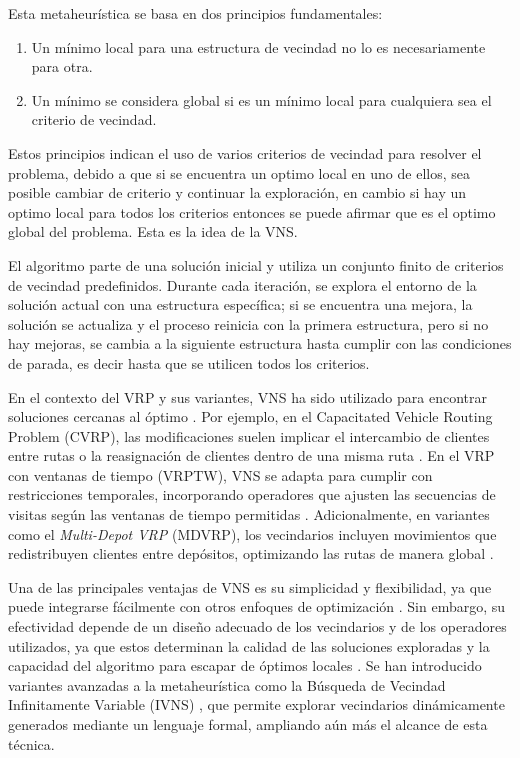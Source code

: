 \documentclass{article}
\begin{document}
Esta metaheurística se basa en dos principios fundamentales:
\begin{enumerate}
\item
Un mínimo local para una estructura de vecindad no lo es necesariamente para otra.
\item
Un mínimo se considera global si es un mínimo local para cualquiera sea el criterio de vecindad.
\end{enumerate}

Estos principios indican el uso de varios criterios de vecindad para resolver el problema, debido a que si se encuentra un optimo local en uno de ellos, sea posible cambiar de criterio y continuar la exploración, en cambio si hay un optimo local para todos los criterios entonces se puede afirmar que es el optimo global del problema. Esta es la idea de la VNS.

El algoritmo parte de una solución inicial y utiliza un conjunto finito de criterios de vecindad predefinidos. Durante cada iteración, se explora el entorno de la solución actual con una estructura específica; si se encuentra una mejora, la solución se actualiza y el proceso reinicia con la primera estructura, pero si no hay mejoras, se cambia a la siguiente estructura hasta cumplir con las condiciones de parada, es decir hasta que se utilicen todos los criterios.

En el contexto del VRP y sus variantes, VNS ha sido utilizado para encontrar soluciones cercanas al óptimo \cite{ref14,ref15}. Por ejemplo, en el Capacitated Vehicle Routing Problem (CVRP), las modificaciones suelen implicar el intercambio de clientes entre rutas o la reasignación de clientes dentro de una misma ruta \cite{ref17}. En el VRP con ventanas de tiempo (VRPTW), VNS se adapta para cumplir con restricciones temporales, incorporando operadores que ajusten las secuencias de visitas según las ventanas de tiempo permitidas \cite{ref14}. Adicionalmente, en variantes como el \textit{Multi-Depot VRP} (MDVRP), los vecindarios incluyen movimientos que redistribuyen clientes entre depósitos, optimizando las rutas de manera global \cite{ref15}.

Una de las principales ventajas de VNS es su simplicidad y flexibilidad, ya que puede integrarse fácilmente con otros enfoques de optimización \cite{ref12}. Sin embargo, su efectividad depende de un diseño adecuado de los vecindarios y de los operadores utilizados, ya que estos determinan la calidad de las soluciones exploradas y la capacidad del algoritmo para escapar de óptimos locales \cite{ref16}. Se han introducido variantes avanzadas a la metaheurística como la Búsqueda de Vecindad Infinitamente Variable (IVNS) \cite{ref16}, que permite explorar vecindarios dinámicamente generados mediante un lenguaje formal, ampliando aún más el alcance de esta técnica.
\end{document}
